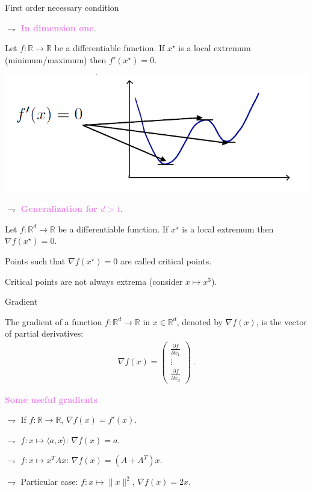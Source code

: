 \documentclass[9pt]{beamer}
\newcommand\R{\mathds{R}}
\begin{document}
\begin{frame}{First order necessary condition}
	
$\rightharpoondown$ {\bf \textcolor{violet}{In dimension one}}.
		
Let $f : \R \to \R$ be a differentiable function. If $x^{\star}$ is a local extremum (minimum/maximum) then $f'(x^{\star}) = 0$.
		
\begin{center}
\includegraphics[scale=0.6]{./extrema_f}
\end{center}
	
$\rightharpoondown$ {\bf \textcolor{violet}{Generalization for $d>1$}}. 
		
Let $f: \R^d \to \R$ be a differentiable function. If $x^{\star}$ is a local extremum then $\nabla f(x^{\star}) = 0$.
		
\vspace{.6cm}

Points such that $\nabla f(x^{\star}) = 0$ are called \alert{critical points}. 
	
\vspace{.2cm}

\alert{Critical points are not always extrema} (consider $x \mapsto x^3$).	
\end{frame}

\begin{frame}{Gradient}
	
The gradient of a function $f: \R^d \to \R$ in $x\in\R^d$, denoted by $\nabla f (x)$, is \alert{the vector of partial derivatives}:
\begin{align*}
\nabla f(x) =  \begin{pmatrix}
			\frac{\partial f}{\partial x_1} \\
			\vdots \\
			\frac{\partial f}{\partial x_d}
		 \end{pmatrix}\,.
\end{align*}

\textbf{\textcolor{violet}{Some useful gradients}}

$\rightharpoondown$ If $f: \R \to \R$, $\nabla f(x) = f'(x)$.

$\rightharpoondown$ $f:x \mapsto \langle a,x\rangle$: $\nabla f(x) = a$.
	
$\rightharpoondown$ $f:x \mapsto x^T A x$: $\nabla f(x) = (A + A^T) x$.
	
$\rightharpoondown$ Particular case: $f: x \mapsto \|x\|^2$, $\nabla f(x) = 2x$.

\end{frame}
\end{document}
